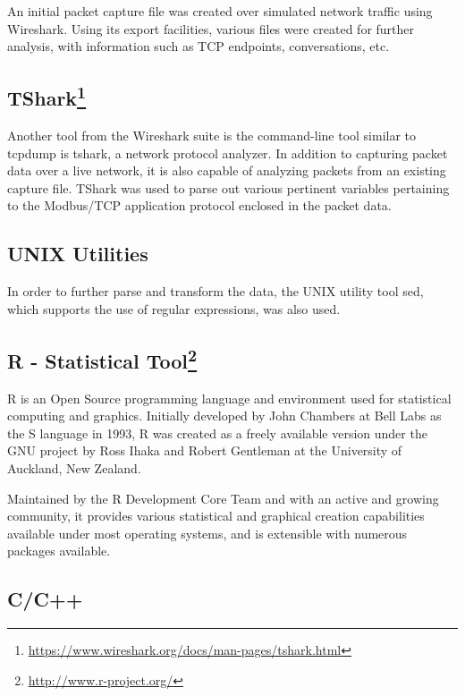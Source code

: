 \documentclass[12pt,]{article}
\begin{document}
An initial packet capture file was created over simulated network
traffic using Wireshark. Using its export facilities, various files were
created for further analysis, with information such as TCP endpoints,
conversations, etc.

\subsection[TShark]{TShark\footnote{\url{https://www.wireshark.org/docs/man-pages/tshark.html}}}\label{tshark3}

Another tool from the Wireshark suite is the command-line tool similar
to tcpdump is tshark, a network protocol analyzer. In addition to
capturing packet data over a live network, it is also capable of
analyzing packets from an existing capture file. TShark was used to
parse out various pertinent variables pertaining to the Modbus/TCP
application protocol enclosed in the packet data.

\subsection{UNIX Utilities}\label{unix-utilities}

In order to further parse and transform the data, the UNIX utility tool
sed, which supports the use of regular expressions, was also used.

\subsection[R - Statistical Tool]{R - Statistical Tool\footnote{\url{http://www.r-project.org/}}}\label{r---statistical-tool4}

R is an Open Source programming language and environment used for
statistical computing and graphics. Initially developed by John Chambers
at Bell Labs as the S language in 1993, R was created as a freely
available version under the GNU project by Ross Ihaka and Robert
Gentleman at the University of Auckland, New Zealand.

Maintained by the R Development Core Team and with an active and growing
community, it provides various statistical and graphical creation
capabilities available under most operating systems, and is extensible
with numerous packages available.

\subsection{C/C++}\label{cc}
\end{document}
